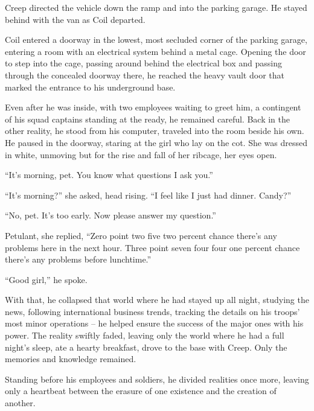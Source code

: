 Creep directed the vehicle down the ramp and into the parking garage.  He stayed behind with the van as Coil departed.



Coil entered a doorway in the lowest, most secluded corner of the parking garage, entering a room with an electrical system behind a metal cage.  Opening the door to step into the cage, passing around behind the electrical box and passing through the concealed doorway there, he reached the heavy vault door that marked the entrance to his underground base.



Even after he was inside, with two employees waiting to greet him, a contingent of his squad captains standing at the ready, he remained careful.  Back in the other reality, he stood from his computer, traveled into the room beside his own.  He paused in the doorway, staring at the girl who lay on the cot.  She was dressed in white, unmoving but for the rise and fall of her ribcage, her eyes open.



``It's morning, pet.  You know what questions I ask you.''



``It's morning?'' she asked, head rising.  ``I feel like I just had dinner.  Candy?''



``No, pet.  It's too early.  Now please answer my question.''



Petulant, she replied, ``Zero point two five two percent chance there's any problems here in the next hour.  Three point seven four four one percent chance there's any problems before lunchtime.''



``Good girl,'' he spoke.



With that, he collapsed that world where he had stayed up all night, studying the news, following international business trends, tracking the details on his troops' most minor operations – he helped ensure the success of the major ones with his power.  The reality swiftly faded, leaving only the world where he had a full night's sleep, ate a hearty breakfast, drove to the base with Creep.  Only the memories and knowledge remained.



Standing before his employees and soldiers, he divided realities once more, leaving only a heartbeat between the erasure of one existence and the creation of another.



